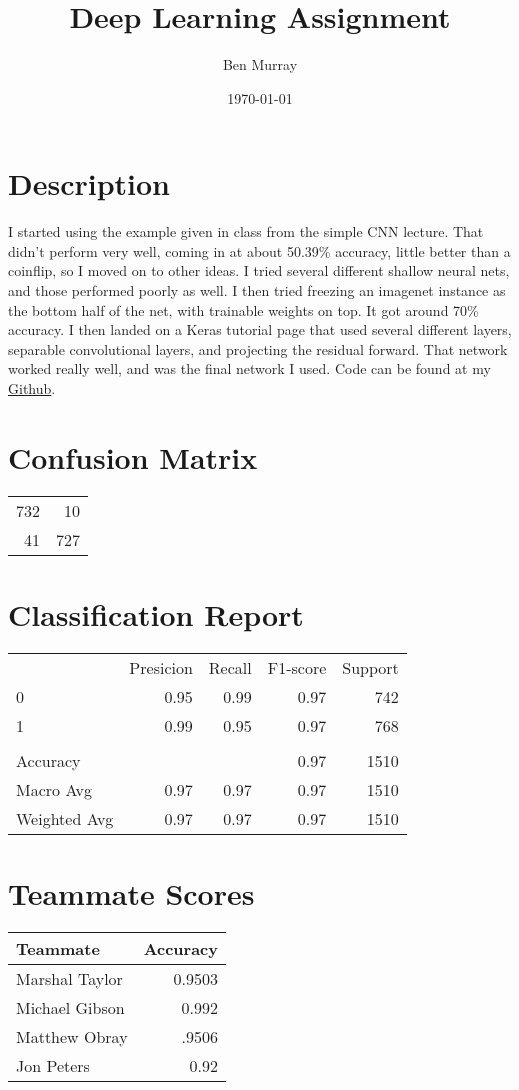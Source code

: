 \documentclass[11pt]{article}
\author{Ben Murray}
\date{\today}
\title{Deep Learning Assignment}
\begin{document}
\maketitle
\tableofcontents


\section{Description}
\label{sec:orga9af92d}

I started using the example given in class from the simple CNN lecture.
That didn't perform very well, coming in at about 50.39\% accuracy, little better than a coinflip, so I moved on to other ideas.
I tried several different shallow neural nets, and those performed poorly as well.
I then tried freezing an imagenet instance as the bottom half of the net, with trainable weights on top.
It got around 70\% accuracy.
I then landed on a Keras tutorial page that used several different layers, separable convolutional layers, and projecting the residual forward.
That network worked really well, and was the final network I used.
Code can be found at my \href{https://github.com/ben-mur64/mask-detection}{Github}.

\section{Confusion Matrix}
\label{sec:org3720cc1}

\begin{center}
\begin{tabular}{rr}
732 & 10\\
41 & 727\\
\end{tabular}
\end{center}

\section{Classification Report}
\label{sec:org4739de7}

\begin{center}
\begin{tabular}{lrrrr}
 & Presicion & Recall & F1-score & Support\\
0 & 0.95 & 0.99 & 0.97 & 742\\
1 & 0.99 & 0.95 & 0.97 & 768\\
 &  &  &  & \\
Accuracy &  &  & 0.97 & 1510\\
Macro Avg & 0.97 & 0.97 & 0.97 & 1510\\
Weighted Avg & 0.97 & 0.97 & 0.97 & 1510\\
\end{tabular}
\end{center}

\section{Teammate Scores}
\label{sec:org0751820}

\begin{center}
\begin{tabular}{lr}
Teammate & Accuracy\\
\hline
Marshal Taylor & 0.9503\\
Michael Gibson & 0.992\\
Matthew Obray & .9506\\
Jon Peters & 0.92\\
\end{tabular}
\end{center}
\end{document}
